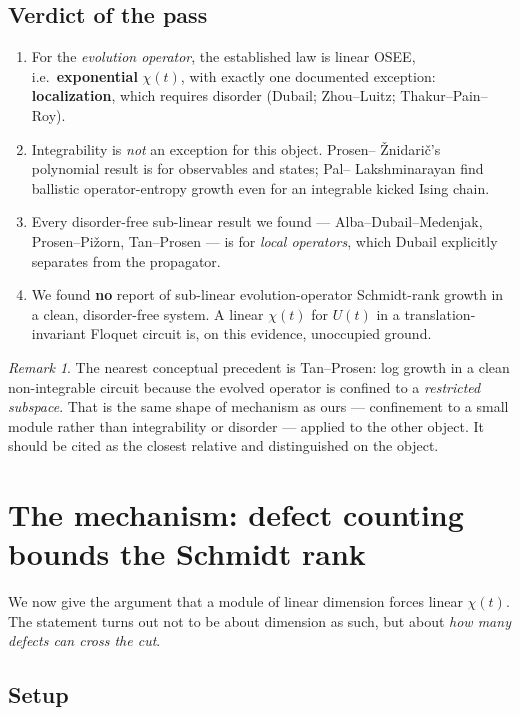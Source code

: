 \documentclass[11pt]{article}
\theoremstyle{plain}
\theoremstyle{remark}
\newtheorem{remark}{Remark}
\begin{document}
\subsection{Verdict of the pass}

\begin{enumerate}
\item For the \emph{evolution operator}, the established law is linear OSEE,
i.e.\ \textbf{exponential} $\chi(t)$, with exactly one documented exception:
\textbf{localization}, which requires disorder
(Dubail; Zhou--Luitz; Thakur--Pain--Roy).
\item Integrability is \emph{not} an exception for this object. Prosen--%
\v{Z}nidari\v{c}'s polynomial result is for observables and states; Pal--%
Lakshminarayan find ballistic operator-entropy growth even for an integrable
kicked Ising chain.
\item Every disorder-free sub-linear result we found --- Alba--Dubail--Medenjak,
Prosen--Pi\v{z}orn, Tan--Prosen --- is for \emph{local operators}, which Dubail
explicitly separates from the propagator.
\item We found \textbf{no} report of sub-linear evolution-operator Schmidt-rank
growth in a clean, disorder-free system. A linear $\chi(t)$ for $U(t)$ in a
translation-invariant Floquet circuit is, on this evidence, unoccupied ground.
\end{enumerate}

\begin{remark}
The nearest conceptual precedent is Tan--Prosen: log growth in a clean
non-integrable circuit because the evolved operator is confined to a
\emph{restricted subspace}. That is the same shape of mechanism as ours ---
confinement to a small module rather than integrability or disorder --- applied
to the other object. It should be cited as the closest relative and distinguished
on the object.
\end{remark}

\section{The mechanism: defect counting bounds the Schmidt rank}
\label{sec:mechanism}

We now give the argument that a module of linear dimension forces linear
$\chi(t)$. The statement turns out not to be about dimension as such, but about
\emph{how many defects can cross the cut}.

\subsection{Setup}
\end{document}
